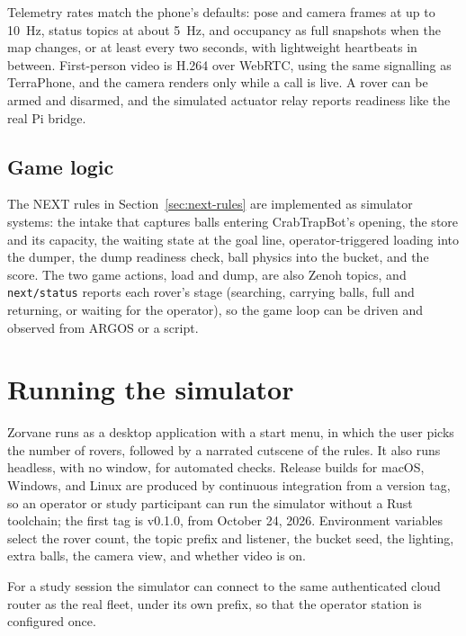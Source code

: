 Telemetry rates match the phone's defaults: pose and camera frames at up to 10~Hz, status topics at about 5~Hz, and occupancy as full snapshots when the map changes, or at least every two seconds, with lightweight heartbeats in between.
First-person video is H.264 over WebRTC, using the same signalling as TerraPhone, and the camera renders only while a call is live.
A rover can be armed and disarmed, and the simulated actuator relay reports readiness like the real Pi bridge.

\subsection{Game logic}

The NEXT rules in Section~\ref{sec:next-rules} are implemented as simulator systems: the intake that captures balls entering CrabTrapBot's opening, the store and its capacity, the waiting state at the goal line, operator-triggered loading into the dumper, the dump readiness check, ball physics into the bucket, and the score.
The two game actions, load and dump, are also Zenoh topics, and \texttt{next/status} reports each rover's stage (searching, carrying balls, full and returning, or waiting for the operator), so the game loop can be driven and observed from ARGOS or a script.

\section{Running the simulator}
\label{sec:sim-running}

Zorvane runs as a desktop application with a start menu, in which the user picks the number of rovers, followed by a narrated cutscene of the rules.
It also runs headless, with no window, for automated checks.
Release builds for macOS, Windows, and Linux are produced by continuous integration from a version tag, so an operator or study participant can run the simulator without a Rust toolchain; the first tag is v0.1.0, from October 24, 2026.
Environment variables select the rover count, the topic prefix and listener, the bucket seed, the lighting, extra balls, the camera view, and whether video is on.

For a study session the simulator can connect to the same authenticated cloud router as the real fleet, under its own prefix, so that the operator station is configured once.

